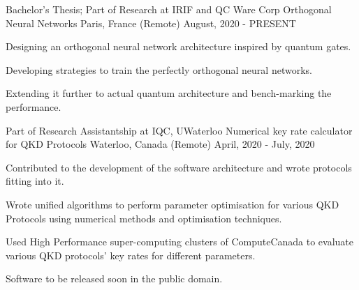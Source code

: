 

\begin{cventries}

  \cventry
    {Bachelor's Thesis; Part of Research at IRIF and QC Ware Corp} %
    {Orthogonal Neural Networks} %
    {Paris, France (Remote)} %
    {August, 2020 - PRESENT} %
    {
      \begin{cvitems} %
        \item {Designing an orthogonal neural network architecture inspired by quantum gates.}
        \item {Developing strategies to train the perfectly orthogonal neural networks.}
        \item {Extending it further to actual quantum architecture and bench-marking the performance.}
      \end{cvitems}
    }


  \cventry
    {Part of Research Assistantship at IQC, UWaterloo} %
    {Numerical key rate calculator for QKD Protocols} %
    {Waterloo, Canada (Remote)} %
    {April, 2020 - July, 2020} %
    {
      \begin{cvitems} %
        \item {Contributed to the development of the software architecture and wrote protocols fitting into it.}
        \item {Wrote unified algorithms to perform parameter optimisation for various QKD Protocols using numerical methods and optimisation techniques.}
        \item {Used High Performance super-computing clusters of ComputeCanada to evaluate various QKD protocols' key rates for different parameters.}
        \item {Software to be released soon in the public domain.}
      \end{cvitems}
    }
    

\end{cventries}
